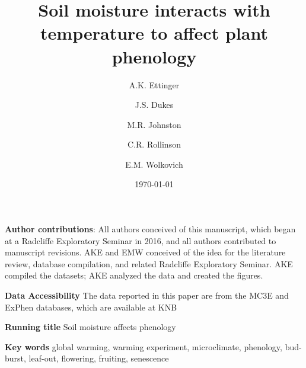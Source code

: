 \documentclass{article}
\begin{document}



\title{Soil moisture interacts with temperature to affect plant phenology} %
\author[1,2,a]{A.K. Ettinger}
\author[3,b]{J.S. Dukes}
\author[4,c]{M.R. Johnston}
\author[5,d]{C.R. Rollinson}
\author[1,4,6,e]{E.M. Wolkovich}









\date{\today}
\maketitle %
\textbf{Author contributions}: All authors conceived of this manuscript, which began at a Radcliffe Exploratory Seminar in 2016, and all authors contributed to manuscript revisions. AKE and EMW conceived of the idea for the literature review, database compilation, and related Radcliffe Exploratory Seminar. AKE compiled the datasets; AKE analyzed the data and created the figures.

\textbf{Data Accessibility} 
The data reported in this paper are from the MC3E and ExPhen databases, which are available at KNB \citep{ettinger2018,ettinger2020}

\textbf{Running title} Soil moisture affects phenology

\textbf{Key words} global warming, warming experiment, microclimate, phenology, bud-burst, leaf-out, flowering, fruiting, senescence 
\end{document}
